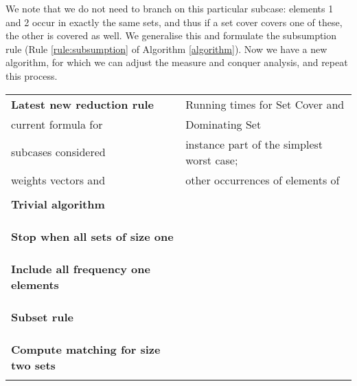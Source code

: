\documentclass[fleqn]{stacs_proc}
\begin{document}
We note that we do not need to branch on this particular subcase:
elements 1 and 2 occur in exactly the same sets, and thus
if a set cover covers one of these, the other is covered as well.
We generalise this and formulate the subsumption rule (Rule
\ref{rule:subsumption} of Algorithm \ref{algorithm}).
Now we have a new algorithm, for which we can adjust the measure and conquer analysis, and repeat this process.


\begin{table} \begin{center}
\begin{tabular}{|ll|}
\hline
\textbf{Latest new reduction rule}		& Running times for {\sc Set Cover} and \\
current formula for 	& \hspace*{5pt} {\sc Dominating Set} \\
subcases considered 					& instance part of the simplest worst case; \\
weights vectors  and 	& \hspace*{5pt}  other occurrences of elements of \\
\hline
\multicolumn{2}{l}{}\\
\hline
\textbf{Trivial algorithm}						&  \\
\multicolumn{2}{|l|}{  } \\

&  \\
 &  \\
\hline
\textbf{Stop when all sets of size one}			&  \\
\multicolumn{2}{|l|}{  }\\

&  \\
 &  \\
\hline
\textbf{Include all frequency one elements}		&  \\
\multicolumn{2}{|l|}{  } \\

&  \\
 &  \\
\hline
\textbf{Subset rule}							&  \\
\multicolumn{2}{|l|}{  } \\

& \\
 &  \\
\hline
\textbf{Compute matching for size two sets} &  \\
\multicolumn{2}{|l|}{  } \\


\end{tabular}
\end{center}
\end{table}
\end{document}

